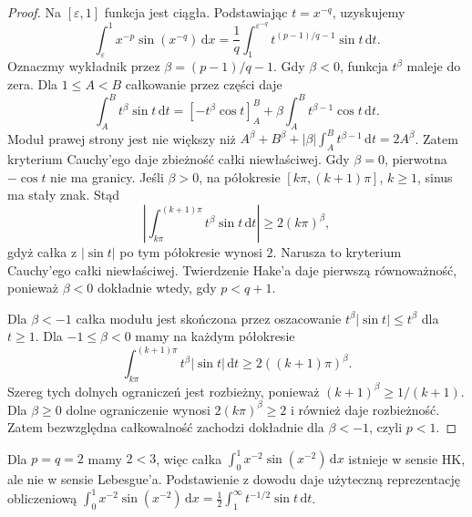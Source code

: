 \begin{proof}
Na $[\varepsilon,1]$ funkcja jest ciągła. Podstawiając $t=x^{-q}$, uzyskujemy
\[
\int_\varepsilon^1x^{-p}\sin(x^{-q})\,\mathrm dx
=\frac1q\int_1^{\varepsilon^{-q}}t^{(p-1)/q-1}\sin t\,\mathrm dt.
\]
Oznaczmy wykładnik przez $\beta=(p-1)/q-1$. Gdy $\beta<0$, funkcja $t^\beta$ maleje do zera. Dla $1\le A<B$ całkowanie przez części daje
\[
\int_A^B t^\beta\sin t\,\mathrm dt
=[-t^\beta\cos t]_A^B+\beta\int_A^B t^{\beta-1}\cos t\,\mathrm dt.
\]
Moduł prawej strony jest nie większy niż $A^\beta+B^\beta+|\beta|\int_A^B t^{\beta-1}\,\mathrm dt=2A^\beta$. Zatem kryterium Cauchy'ego daje zbieżność całki niewłaściwej. Gdy $\beta=0$, pierwotna $-\cos t$ nie ma granicy. Jeśli $\beta>0$, na półokresie $[k\pi,(k+1)\pi]$, $k\ge1$, sinus ma stały znak. Stąd
\[
 \left|\int_{k\pi}^{(k+1)\pi}t^\beta\sin t\,\mathrm dt\right|
 \ge 2(k\pi)^\beta,
\]
gdyż całka z $|\sin t|$ po tym półokresie wynosi $2$. Narusza to kryterium Cauchy'ego całki niewłaściwej. Twierdzenie Hake'a daje pierwszą równoważność, ponieważ $\beta<0$ dokładnie wtedy, gdy $p<q+1$.

Dla $\beta<-1$ całka modułu jest skończona przez oszacowanie $t^\beta|\sin t|\le t^\beta$ dla $t\ge1$. Dla $-1\le\beta<0$ mamy na każdym półokresie
\[
 \int_{k\pi}^{(k+1)\pi}t^\beta|\sin t|\,\mathrm dt
 \ge 2((k+1)\pi)^\beta.
\]
Szereg tych dolnych ograniczeń jest rozbieżny, ponieważ $(k+1)^\beta\ge 1/(k+1)$. Dla $\beta\ge0$ dolne ograniczenie wynosi $2(k\pi)^\beta\ge2$ i również daje rozbieżność. Zatem bezwzględna całkowalność zachodzi dokładnie dla $\beta<-1$, czyli $p<1$.
\end{proof}
\begin{przyklad}
Dla $p=q=2$ mamy $2<3$, więc całka $\int_0^1x^{-2}\sin(x^{-2})\,\mathrm dx$ istnieje w sensie HK, ale nie w sensie Lebesgue'a. Podstawienie z dowodu daje użyteczną reprezentację obliczeniową
$\int_0^1x^{-2}\sin(x^{-2})\,\mathrm dx=\tfrac12\int_1^\infty t^{-1/2}\sin t\,\mathrm dt$.
\end{przyklad}
